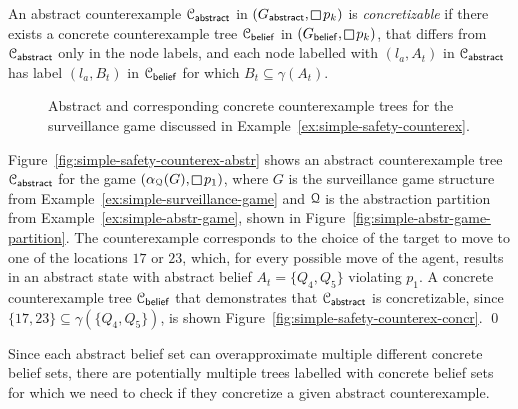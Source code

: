 An abstract counterexample $\mathcal{C}_{\mathsf{abstract}}$ in $(G_\abstr,\LTLglobally p_k)$ is \emph{concretizable} if there exists a concrete counterexample 
tree $\mathcal{C}_{\mathsf{belief}}$ in $(G_\belief,\LTLglobally p_k)$, that differs from $\mathcal{C}_{\mathsf{abstract}}$ only in the node labels, and each node labelled with $(l_a,A_t)$ in $\mathcal{C}_{\mathsf{abstract}}$ has label $(l_a, B_t)$ in $\mathcal{C}_{\mathsf{belief}}$ for which $B_t \subseteq \gamma(A_t)$.

\bigskip

\begin{figure}
\hfill
{}
\caption{Abstract and corresponding concrete counterexample trees for the surveillance game discussed in Example~\ref{ex:simple-safety-counterex}.}
\label{fig:simple-safety-counterex}

\end{figure}

\begin{eg}\label{ex:simple-safety-counterex}
Figure~\ref{fig:simple-safety-counterex-abstr} shows an abstract counterexample tree $\mathcal{C}_{\mathsf{abstract}}$ for the game $(\alpha_\partition(G),\LTLglobally p_1)$, where $G$ is the surveillance game structure from Example~\ref{ex:simple-surveillance-game} and $\mathcal{Q}$ is the abstraction partition from Example~\ref{ex:simple-abstr-game}, shown in Figure~\ref{fig:simple-abstr-game-partition}. The counterexample corresponds to the choice of the target to move to one of the locations $17$ or $23$, which, for every possible move of the agent, results in an abstract state with abstract belief $A_t = \{Q_4,Q_5\}$ violating $p_1$.
A concrete counterexample tree $\mathcal{C}_{\mathsf{belief}}$ that demonstrates that $\mathcal{C}_{\mathsf{abstract}}$ is concretizable, since $\{17,23\} \subseteq \gamma(\{Q_4,Q_5\})$, is shown Figure~\ref{fig:simple-safety-counterex-concr}.
\qed
\end{eg}

\bigskip

Since each abstract belief set can overapproximate multiple different concrete belief sets, there are potentially multiple trees labelled with concrete belief sets for which we need to check if they concretize a given abstract counterexample.

